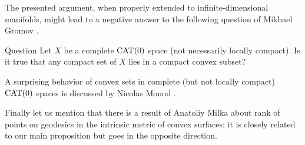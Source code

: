 \documentclass[a4paper,10pt]{article}
\begin{document}
The presented argument, when properly extended to infinite-dimensional manifolds, might lead to a negative answer to the following question of Mikhael Gromov \cite[6.B\textsubscript{1}(f)]{gromov-1993}.

\begin{thm}{Question}
Let $X$ be a complete  $\operatorname{\rm CAT}(0)$ space (not necessarily locally compact).
Is it true that any compact set of $X$ lies in a compact convex subset?
\end{thm}

A surprising behavior of convex sets in complete (but not locally compact) $\operatorname{\rm CAT}(0)$ spaces is discussed by Nicolas Monod \cite{monod}.

Finally let us mention that there is a result of Anatoliy Milka \cite[§~4]{milka} about rank of points on geodesics in the intrinsic metric of convex surfaces; it is closely related to our main proposition but goes in the opposite direction.

{\sloppy
\printbibliography[heading=bibintoc]
\fussy
}
\end{document}
